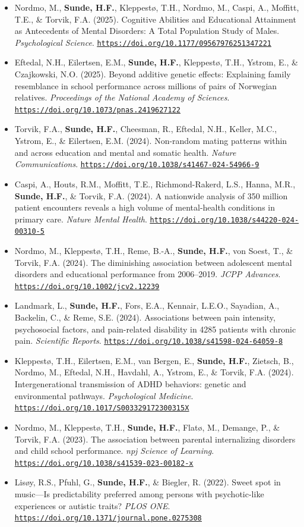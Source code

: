 \documentclass[10pt,a4paper]{article}
\let\cvhref\href
\renewcommand{\href}[2]{\cvhref{#1}{\underline{#2}}}%
\renewcommand{\url}[1]{\href{#1}{\nolinkurl{#1}}}%
\begin{document}
\begin{itemize}
\item Nordmo, M., \textbf{Sunde, H.F.}, Kleppestø, T.H., Nordmo, M., Caspi, A., Moffitt, T.E., \& Torvik, F.A. (2025). Cognitive Abilities and Educational Attainment as Antecedents of Mental Disorders: A Total Population Study of Males. \textit{Psychological Science}. \url{https://doi.org/10.1177/09567976251347221}
\item Eftedal, N.H., Eilertsen, E.M., \textbf{Sunde, H.F.}, Kleppestø, T.H., Ystrom, E., \& Czajkowski, N.O. (2025). Beyond additive genetic effects: Explaining family resemblance in school performance across millions of pairs of Norwegian relatives. \textit{Proceedings of the National Academy of Sciences}. \url{https://doi.org/10.1073/pnas.2419627122}
\item Torvik, F.A., \textbf{Sunde, H.F.}, Cheesman, R., Eftedal, N.H., Keller, M.C., Ystrom, E., \& Eilertsen, E.M. (2024). Non-random mating patterns within and across education and mental and somatic health. \textit{Nature Communications}. \url{https://doi.org/10.1038/s41467-024-54966-9}
\item Caspi, A., Houts, R.M., Moffitt, T.E., Richmond-Rakerd, L.S., Hanna, M.R., \textbf{Sunde, H.F.}, \& Torvik, F.A. (2024). A nationwide analysis of 350 million patient encounters reveals a high volume of mental-health conditions in primary care. \textit{Nature Mental Health}. \url{https://doi.org/10.1038/s44220-024-00310-5}
\item Nordmo, M., Kleppestø, T.H., Reme, B.-A., \textbf{Sunde, H.F.}, von Soest, T., \& Torvik, F.A. (2024). The diminishing association between adolescent mental disorders and educational performance from 2006--2019. \textit{JCPP Advances}. \url{https://doi.org/10.1002/jcv2.12239}
\item Landmark, L., \textbf{Sunde, H.F.}, Fors, E.A., Kennair, L.E.O., Sayadian, A., Backelin, C., \& Reme, S.E. (2024). Associations between pain intensity, psychosocial factors, and pain-related disability in 4285 patients with chronic pain. \textit{Scientific Reports}. \url{https://doi.org/10.1038/s41598-024-64059-8}
\item Kleppestø, T.H., Eilertsen, E.M., van Bergen, E., \textbf{Sunde, H.F.}, Zietsch, B., Nordmo, M., Eftedal, N.H., Havdahl, A., Ystrom, E., \& Torvik, F.A. (2024). Intergenerational transmission of ADHD behaviors: genetic and environmental pathways. \textit{Psychological Medicine}. \url{https://doi.org/10.1017/S003329172300315X}
\item Nordmo, M., Kleppestø, T.H., \textbf{Sunde, H.F.}, Flatø, M., Demange, P., \& Torvik, F.A. (2023). The association between parental internalizing disorders and child school performance. \textit{npj Science of Learning}. \url{https://doi.org/10.1038/s41539-023-00182-x}
\item Lisøy, R.S., Pfuhl, G., \textbf{Sunde, H.F.}, \& Biegler, R. (2022). Sweet spot in music---Is predictability preferred among persons with psychotic-like experiences or autistic traits? \textit{PLOS ONE}. \url{https://doi.org/10.1371/journal.pone.0275308}
\end{itemize}
\end{document}
